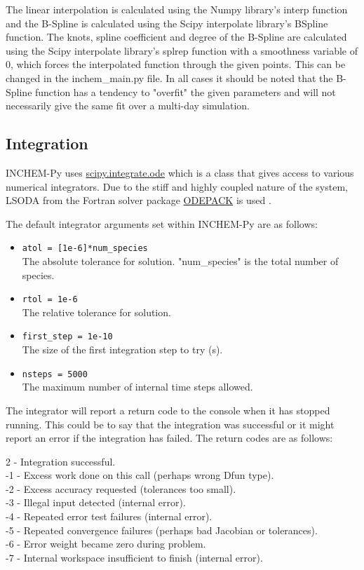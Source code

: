 \documentclass[a4paper]{refart}
\begin{document}
The linear interpolation is calculated using the Numpy library's interp function and the B-Spline is calculated using the Scipy interpolate library's BSpline function. The knots, spline coefficient and degree of the B-Spline are calculated using the Scipy interpolate library's splrep function with a smoothness variable of 0, which forces the interpolated function through the given points. This can be changed in the inchem\_main.py file. In all cases it should be noted that the B-Spline function has a tendency to "overfit" the given parameters and will not necessarily give the same fit over a multi-day simulation.

\subsection{Integration}\label{Integration}
INCHEM-Py uses \hyperlink{https://docs.scipy.org/doc/scipy/reference/generated/scipy.integrate.ode.html}{scipy.integrate.ode} which is a class that gives access to various numerical integrators. Due to the stiff and highly coupled nature of the system, LSODA from the Fortran solver package \hyperlink{http://www.netlib.org/odepack/}{ODEPACK} is used \cite{Hindmarsh1983}. 

The default integrator arguments set within INCHEM-Py are as follows:
\begin{itemize}
    \item \texttt{atol = [1e-6]*num\_species}\\
    The absolute tolerance for solution. "num\_species" is the total number of species.
    \item \texttt{rtol = 1e-6}\\
    The relative tolerance for solution.
    \item \texttt{first\_step = 1e-10}\\
    The size of the first integration step to try (s).
    \item \texttt{nsteps = 5000}\\
    The maximum number of internal time steps allowed.
\end{itemize}


The integrator will report a return code to the console when it has stopped running. This could be to say that the integration was successful or it might report an error if the integration has failed. The return codes are as follows:

2 - Integration successful.\\
-1 - Excess work done on this call (perhaps wrong Dfun type).\\
-2 - Excess accuracy requested (tolerances too small).\\
-3 - Illegal input detected (internal error).\\
-4 - Repeated error test failures (internal error).\\
-5 - Repeated convergence failures (perhaps bad Jacobian or tolerances).\\
-6 - Error weight became zero during problem.\\
-7 - Internal workspace insufficient to finish (internal error).
\end{document}
